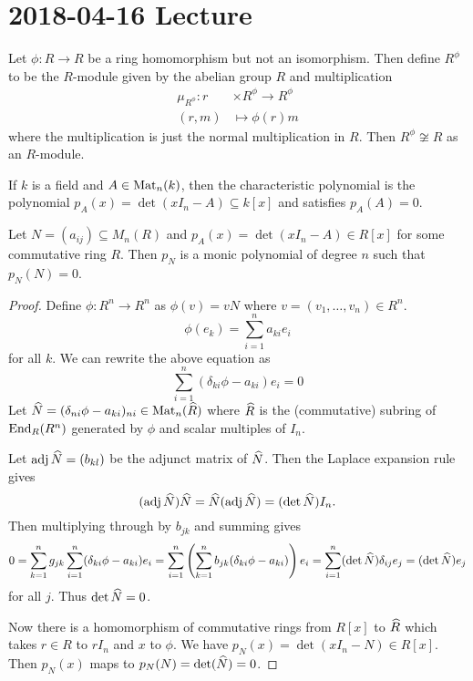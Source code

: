 \section{2018-04-16 Lecture}

\begin{exam}
	Let $\phi:R \to R$ be a ring homomorphism but not an isomorphism.
	Then define $R^\phi$ to be the $R$-module given by the abelian group $R$ and multiplication
	\begin{align*}
		\mu_{R^\phi}: r &\times R^\phi \to R^\phi \\
		(r,m) &\mapsto \phi(r)m
	\end{align*}
	where the multiplication is just the normal multiplication in $R$.
	Then $R^\phi \not\cong R$ as an $R$-module.
\end{exam}

If $k$ is a field and $A \in \operatorname{Mat}_n(k)$, then the characteristic polynomial is the polynomial $p_A(x) = \det(xI_n-A) \subseteq k[x]$ and satisfies $p_A(A)=0$.

\begin{thm}
	Let $N = (a_{ij}) \subseteq M_n(R)$ and $p_A(x) = \det(xI_n-A) \in R[x]$ for some commutative ring $R$.
	Then $p_N$ is a monic polynomial of degree $n$ such that $p_N(N)=0$.
\end{thm}

\begin{proof}
	Define $\phi: R^n \to R^n$ as $\phi(v)=vN$ where $v=(v_1,\ldots,v_n) \in R^n$.
	\[\phi(e_k) = \sum_{i=1}^n a_{ki}e_i\]
	for all $k$.
	We can rewrite the above equation as
	\[\sum_{i=1}^n (\delta_{ki}\phi-a_{ki})e_i=0\]
	Let $\widehat{N}=(\delta_{ni}\phi-a_{ki})_{ni} \in \operatorname{Mat}_n(\widehat R)$ where $\widehat R$ is the (commutative) subring of $\operatorname{End}_R(R^n)$ generated by $\phi$ and scalar multiples of $I_n$.

	Let $\operatorname{adj} \widehat N = (b_{kl})$ be the adjunct matrix of $\widehat N$.
	Then the Laplace expansion rule gives
	\[ (\operatorname{adj}\widehat N)\widehat N = \widehat N(\operatorname{adj}\widehat N) = (\det\widehat N) I_n.\]
	Then multiplying through by $b_{jk}$ and summing gives
	\[0 = \sum_{k=1}^n g_{jk} \sum_{i=1}^n (\delta_{ki}\phi-a_{ki})e_i = \sum_{i=1}^n \left( \sum_{k=1}^n b_{jk}(\delta_{ki}\phi-a_{ki})\right)e_i = \sum_{i=1}^n (\det \widehat N)\delta_{ij} e_j = (\det \widehat N)e_j\]
	for all $j$.
	Thus $\det \widehat N=0$.
	
	Now there is a homomorphism of commutative rings from $R[x]$ to $\widehat R$ which takes $r \in R$ to $rI_n$ and $x$ to $\phi$.
	We have $p_N(x) = \det(xI_n-N) \in R[x]$.
	Then $p_N(x)$ maps to $p_N(N) = \det (\widehat N) = 0$.
\end{proof}

